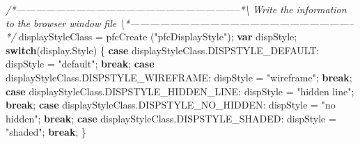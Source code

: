 \documentclass[]{article}
\newenvironment{Shaded}{}{}
\newcommand{\KeywordTok}[1]{\textcolor[rgb]{0.00,0.44,0.13}{\textbf{{#1}}}}
\newcommand{\StringTok}[1]{\textcolor[rgb]{0.25,0.44,0.63}{{#1}}}
\newcommand{\CommentTok}[1]{\textcolor[rgb]{0.38,0.63,0.69}{\textit{{#1}}}}
\newcommand{\OtherTok}[1]{\textcolor[rgb]{0.00,0.44,0.13}{{#1}}}
\newcommand{\FunctionTok}[1]{\textcolor[rgb]{0.02,0.16,0.49}{{#1}}}
\newcommand{\NormalTok}[1]{{#1}}
\begin{document}
\begin{Shaded}
\begin{Highlighting}[]
\CommentTok{/*--------------------------------------------------------------------*\textbackslash{} }
\CommentTok{  Write the information to the browser window file}
\CommentTok{\textbackslash{}*--------------------------------------------------------------------*/}
      \NormalTok{displayStyleClass = }\FunctionTok{pfcCreate} \NormalTok{(}\StringTok{"pfcDisplayStyle"}\NormalTok{); }
      \KeywordTok{var} \NormalTok{dispStyle;}
      \KeywordTok{switch}\NormalTok{(}\OtherTok{display}\NormalTok{.}\FunctionTok{Style}\NormalTok{)}
    \NormalTok{\{         }
    \KeywordTok{case} \OtherTok{displayStyleClass}\NormalTok{.}\FunctionTok{DISPSTYLE_DEFAULT}\NormalTok{: }
      \NormalTok{dispStyle = }\StringTok{"default"}\NormalTok{; }
      \KeywordTok{break}\NormalTok{;}
    \KeywordTok{case} \OtherTok{displayStyleClass}\NormalTok{.}\FunctionTok{DISPSTYLE_WIREFRAME}\NormalTok{: }
      \NormalTok{dispStyle = }\StringTok{"wireframe"}\NormalTok{; }
      \KeywordTok{break}\NormalTok{;}
    \KeywordTok{case} \OtherTok{displayStyleClass}\NormalTok{.}\FunctionTok{DISPSTYLE_HIDDEN_LINE}\NormalTok{: }
      \NormalTok{dispStyle = }\StringTok{"hidden line"}\NormalTok{; }
      \KeywordTok{break}\NormalTok{;}
    \KeywordTok{case} \OtherTok{displayStyleClass}\NormalTok{.}\FunctionTok{DISPSTYLE_NO_HIDDEN}\NormalTok{: }
      \NormalTok{dispStyle = }\StringTok{"no hidden"}\NormalTok{;}
      \KeywordTok{break}\NormalTok{;}
    \KeywordTok{case} \OtherTok{displayStyleClass}\NormalTok{.}\FunctionTok{DISPSTYLE_SHADED}\NormalTok{: }
      \NormalTok{dispStyle = }\StringTok{"shaded"}\NormalTok{; }
      \KeywordTok{break}\NormalTok{;         }
    \NormalTok{\}}
      

\end{Highlighting}
\end{Shaded}
\end{document}
